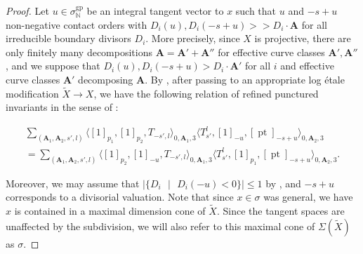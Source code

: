 \documentclass[12pt, oneside]{amsart}   	%
\newcommand{\NN}{\mathbb{N}}
\newcommand{\pt}{\operatorname{pt}}
\newcommand{\gp}{\operatorname{gp}}
\numberwithin{equation}{section}
\numberwithin{thm}{section}
\numberwithin{figure}{section}
\begin{document}
 \begin{proof}
Let $u \in \sigma^{\gp}_{\NN}$ be an integral tangent vector to $x$ such that $u$ and $-s+u$ non-negative contact orders with $D_i(u),D_i(-s+u) >> D_i\cdot \textbf{A}$ for all irreducible boundary divisors $D_i$. More precisely, since $X$ is projective, there are only finitely many decompositions $\textbf{A} = \textbf{A}' + \textbf{A}''$ for effective curve classes $\textbf{A}',\textbf{A}''$, and we suppose that $D_i(u),D_i(-s+u) > D_i\cdot\textbf{A}'$ for all $i$ and effective curve classes $\textbf{A}'$ decomposing $\textbf{A}$. By \cite[Theorem $8.3$]{logWDVV}, after passing to an appropriate log \'etale modification $\widetilde{X}\rightarrow X$, we have the following relation of refined punctured invariants in the sense of \cite{BNR2}:
 
 \begin{equation}\label{WDVV2}
\begin{split}
\sum_{(\textbf{A}_1, \textbf{A}_2,s',l)} \langle[1]_{p_1},[1]_{p_2},T_{-s',l}\rangle_{0,\textbf{A}_1,3}\langle T^l_{s'},[1]_{-u},[\pt]_{-s+u}\rangle_{0,\textbf{A}_2,3} \\
= \sum_{(\textbf{A}_1, \textbf{A}_2 ,s',l)} \langle[1]_{p_2},[1]_{-u},T_{-s',l}\rangle_{0,\textbf{A}_1,3}\langle T^l_{s'},[1]_{p_1},[\pt]_{-s+u}\rangle_{0,\textbf{A}_2,3}.
\end{split}
\end{equation}

 
Moreover, we may assume that $|\{D_i\text{ }|\text{ }D_i(-u)< 0\}| \le 1$ by \cite[Proposition $6.1$]{BNR2}, and $-s+u$ corresponds to a divisorial valuation. Note that since $x \in \sigma$ was general, we have $x$ is contained in a maximal dimension cone of $\widetilde{X}$. Since the tangent spaces are unaffected by the subdivision, we will also refer to this maximal cone of $\Sigma(\widetilde{X})$ as $\sigma$. 



\end{proof}
\end{document}
